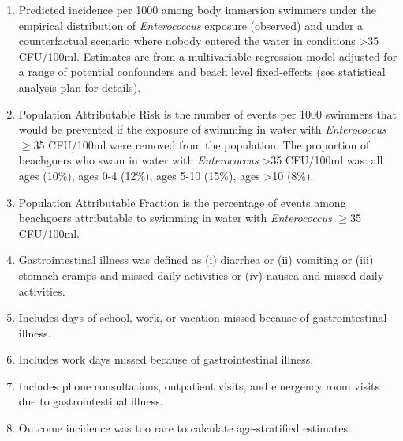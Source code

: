 \documentclass[12pt]{article}\usepackage[]{graphicx}\usepackage[]{color}
\begin{document}
\begin{table}[h!tb]
\begin{footnotesize}
\begin{center}
\begin{tabular}{l rr cc rl rl}
& \\
\hline
\end{tabular}
\end{center}
\end{footnotesize}
\begin{scriptsize}
\begin{minipage}{\textwidth}
\begin{enumerate}
  \setlength{\itemsep}{1pt}
  \item Predicted incidence per 1000 among body immersion swimmers under the empirical distribution of \textit{Enterococcus} exposure (observed) and under a counterfactual scenario where nobody entered the water in conditions >35 CFU/100ml. Estimates are from a multivariable regression model adjusted for a range of potential confounders and beach level fixed-effects (see statistical analysis plan for details).
  \item Population Attributable Risk is the number of events per 1000 swimmers that would be prevented if the exposure of swimming in water with \textit{Enterococcus} $\geq$35 CFU/100ml were removed from the population. The proportion of beachgoers who swam in water with \textit{Enterococcus} >35 CFU/100ml was: all ages (10\%), ages 0-4 (12\%), ages 5-10 (15\%), ages >10 (8\%). 
  \item Population Attributable Fraction is the percentage of events among beachgoers attributable to swimming in water with \textit{Enterococcus} $\geq$35 CFU/100ml.
  \item Gastrointestinal illness was defined as (i) diarrhea or (ii) vomiting or (iii) stomach cramps and missed daily activities or (iv) nausea and missed daily activities.
  \item Includes days of school, work, or vacation missed because of gastrointestinal illness.
  \item Includes work days missed because of gastrointestinal illness.
  \item Includes phone consultations, outpatient visits, and emergency room visits due to gastrointestinal illness. 
  \item Outcome incidence was too rare to calculate age-stratified estimates.
\end{enumerate}
\end{minipage}
\end{scriptsize}
\end{table}



\clearpage
\end{document}
